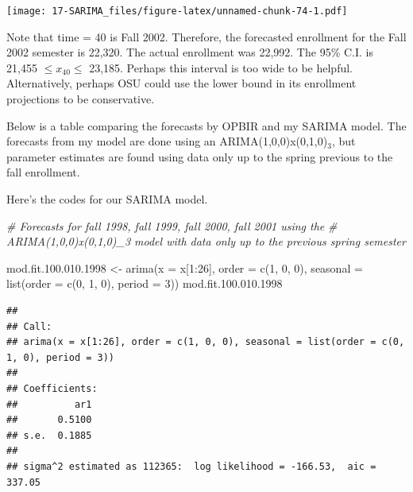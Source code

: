 \documentclass[
]{book}
\newenvironment{Shaded}{\begin{snugshade}}{\end{snugshade}}
\newcommand{\AttributeTok}[1]{\textcolor[rgb]{0.77,0.63,0.00}{#1}}
\newcommand{\CommentTok}[1]{\textcolor[rgb]{0.56,0.35,0.01}{\textit{#1}}}
\newcommand{\DecValTok}[1]{\textcolor[rgb]{0.00,0.00,0.81}{#1}}
\newcommand{\FloatTok}[1]{\textcolor[rgb]{0.00,0.00,0.81}{#1}}
\newcommand{\FunctionTok}[1]{\textcolor[rgb]{0.00,0.00,0.00}{#1}}
\newcommand{\NormalTok}[1]{#1}
\newcommand{\OtherTok}[1]{\textcolor[rgb]{0.56,0.35,0.01}{#1}}
\newcommand{\SpecialCharTok}[1]{\textcolor[rgb]{0.00,0.00,0.00}{#1}}
\theoremstyle{definition}
\theoremstyle{definition}
\theoremstyle{definition}
\theoremstyle{definition}
\theoremstyle{remark}
\begin{document}
\texttt{[image: 17-SARIMA\_files/figure-latex/unnamed-chunk-74-1.pdf]}

Note that time = 40 is Fall 2002. Therefore, the forecasted enrollment for the Fall 2002 semester is 22,320. The actual enrollment was 22,992. The 95\% C.I. is 21,455 \(\le x_{40} \le\) 23,185. Perhaps this interval is too wide to be helpful. Alternatively, perhaps OSU could use the lower bound in its enrollment projections to be conservative.

Below is a table comparing the forecasts by OPBIR and my SARIMA model. The forecasts from my model are done using an ARIMA(1,0,0)x(0,1,0)\(_3\), but parameter estimates are found using data only up to the spring previous to the fall enrollment.

Here's the codes for our SARIMA model.

\begin{Shaded}
\begin{Highlighting}[]
\CommentTok{\# Forecasts for fall 1998, fall 1999, fall 2000, fall 2001 using the }
\CommentTok{\#  ARIMA(1,0,0)x(0,1,0)\_3 model with data only up to the previous spring semester}

\NormalTok{  mod.fit.}\DecValTok{100}\NormalTok{.}\FloatTok{010.1998} \OtherTok{\textless{}{-}} \FunctionTok{arima}\NormalTok{(}\AttributeTok{x =}\NormalTok{ x[}\DecValTok{1}\SpecialCharTok{:}\DecValTok{26}\NormalTok{], }\AttributeTok{order =} \FunctionTok{c}\NormalTok{(}\DecValTok{1}\NormalTok{, }\DecValTok{0}\NormalTok{, }\DecValTok{0}\NormalTok{), }\AttributeTok{seasonal =} \FunctionTok{list}\NormalTok{(}\AttributeTok{order =} \FunctionTok{c}\NormalTok{(}\DecValTok{0}\NormalTok{, }\DecValTok{1}\NormalTok{, }\DecValTok{0}\NormalTok{), }\AttributeTok{period =} \DecValTok{3}\NormalTok{))}
\NormalTok{  mod.fit.}\DecValTok{100}\NormalTok{.}\FloatTok{010.1998}
\end{Highlighting}
\end{Shaded}

\begin{verbatim}
## 
## Call:
## arima(x = x[1:26], order = c(1, 0, 0), seasonal = list(order = c(0, 1, 0), period = 3))
## 
## Coefficients:
##          ar1
##       0.5100
## s.e.  0.1885
## 
## sigma^2 estimated as 112365:  log likelihood = -166.53,  aic = 337.05
\end{verbatim}
\end{document}
